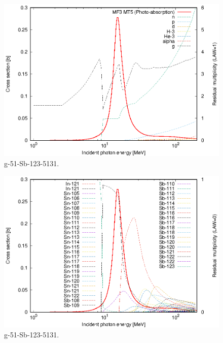 \begin{figure}
 \includegraphics[width=\linewidth]{eps/g_51-Sb-123_5131.eps}
  \caption{g-51-Sb-123-5131.}
\end{figure}
\begin{figure}
 \includegraphics[width=\linewidth]{eps-law0/g_51-Sb-123_5131.eps}
 \caption{g-51-Sb-123-5131.}
\end{figure}
\newpage \clearpage

